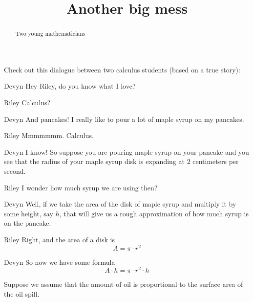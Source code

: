 \documentclass{ximera}
\title[Break-Ground:]{Another big mess}
\begin{document}
\begin{abstract}
Two young mathematicians 
\end{abstract}
\maketitle

Check out this dialogue between two calculus students (based on a true
story):


\begin{dialogue}
\item[Devyn] Hey Riley, do you know what I love?
\item[Riley] Calculus? 
\item[Devyn] And pancakes! I really like to pour a lot of maple syrup
  on my pancakes.
\item[Riley] Mmmmmmm. Calculus. 
\item[Devyn] I know! So suppose you are pouring maple syrup on your
  pancake and you see that the radius of your maple syrup disk is
  expanding at $2$ centimeters per second.
\item[Riley] I wonder how much syrup we are using then?
\item[Devyn] Well, if we take the area of the disk of maple syrup and
  multiply it by some height, say $h$, that will give us a rough
  approximation of how much syrup is on the pancake.
\item[Riley] Right, and the area of a disk is
  \[
  A = \pi \cdot r^2
  \]
\item[Devyn] So now we have some formula
  \[
 A\cdot h = \pi \cdot r^2 \cdot h 
  \]
\end{dialogue}

Suppose we assume that the amount of oil is proportional to the surface area of the oil spill. 

\begin{problem}
\end{problem}


\end{document}
